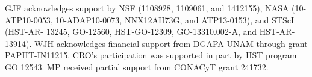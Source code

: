 \documentclass[debug, preprint, twocolumn]{rmaa}
\begin{document}
\acknowledgments

GJF acknowledges support by NSF (1108928, 1109061, and 1412155), NASA (10-ATP10-0053, 10-ADAP10-0073, NNX12AH73G, and ATP13-0153), and STScI (HST-AR- 13245, GO-12560, HST-GO-12309, GO-13310.002-A, and HST-AR-13914).
WJH acknowledges financial support from DGAPA-UNAM through grant PAPIIT-IN11215.
CRO's participation was supported in part by HST program GO 12543.
MP received partial support from CONACyT grant 241732.

\clearpage

\end{document}
